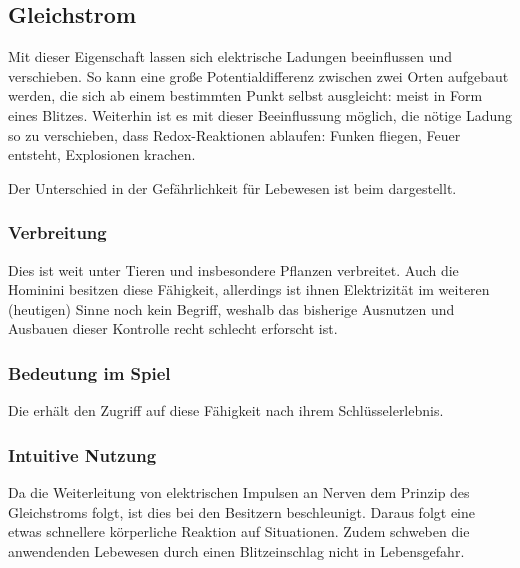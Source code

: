 \subsection{Gleichstrom}\label{magie:gleichstrom}
Mit dieser Eigenschaft lassen sich elektrische Ladungen beeinflussen und verschieben.
So kann eine große Potentialdifferenz zwischen zwei Orten aufgebaut werden, die sich ab einem bestimmten Punkt selbst ausgleicht: meist in Form eines Blitzes.
Weiterhin ist es mit dieser Beeinflussung möglich, die nötige Ladung so zu verschieben, dass Redox-Reaktionen ablaufen: Funken fliegen, Feuer entsteht, Explosionen krachen.

Der Unterschied in der Gefährlichkeit für Lebewesen ist beim  dargestellt.

\subsubsection{Verbreitung}
Dies ist weit unter Tieren und insbesondere Pflanzen verbreitet. 
Auch die Hominini besitzen diese Fähigkeit, allerdings ist ihnen Elektrizität im weiteren (heutigen) Sinne noch kein Begriff, weshalb das bisherige Ausnutzen und Ausbauen dieser Kontrolle recht schlecht erforscht ist.

\subsubsection{Bedeutung im Spiel}
Die  erhält den Zugriff auf diese Fähigkeit nach ihrem Schlüsselerlebnis. 

\subsubsection{Intuitive Nutzung}
Da die Weiterleitung von elektrischen Impulsen an Nerven dem Prinzip des Gleichstroms folgt, ist dies bei den Besitzern beschleunigt.
Daraus folgt eine etwas schnellere körperliche Reaktion auf Situationen.
Zudem schweben die anwendenden Lebewesen durch einen Blitzeinschlag nicht in Lebensgefahr.  

